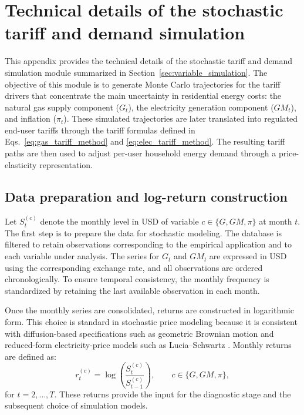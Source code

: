 \documentclass[authoryear,preprint,review,10pt]{elsarticle}
\begin{document}
\section{Technical details of the stochastic tariff and demand simulation}
\label{appendix:stochastic_simulation}

This appendix provides the technical details of the stochastic tariff and demand simulation module summarized in Section~\ref{sec:variable_simulation}. The objective of this module is to generate Monte Carlo trajectories for the tariff drivers that concentrate the main uncertainty in residential energy costs: the natural gas supply component ($G_t$), the electricity generation component ($GM_t$), and inflation ($\pi_t$). These simulated trajectories are later translated into regulated end-user tariffs through the tariff formulas defined in Eqs.~\eqref{eq:gas_tariff_method} and \eqref{eq:elec_tariff_method}. The resulting tariff paths are then used to adjust per-user household energy demand through a price-elasticity representation.

\subsection{Data preparation and log-return construction}
\label{appendix:prep}

Let $S_t^{(c)}$ denote the monthly level in USD of variable $c \in \{G,GM,\pi\}$ at month $t$. The first step is to prepare the data for stochastic modeling. The database is filtered to retain observations corresponding to the empirical application and to each variable under analysis. The series for $G_t$ and $GM_t$ are expressed in USD using the corresponding exchange rate, and all observations are ordered chronologically. To ensure temporal consistency, the monthly frequency is standardized by retaining the last available observation in each month.

Once the monthly series are consolidated, returns are constructed in logarithmic form. This choice is standard in stochastic price modeling because it is consistent with diffusion-based specifications such as geometric Brownian motion \citep{ibrahim2021geometric} and reduced-form electricity-price models such as Lucia--Schwartz \citep{lucia2002electricity}. Monthly returns are defined as:
\begin{equation}
    r_t^{(c)} = \log\!\left(\frac{S_t^{(c)}}{S_{t-1}^{(c)}}\right),
    \qquad c \in \{G,GM,\pi\},
\end{equation}
for $t = 2,\dots,T$. These returns provide the input for the diagnostic stage and the subsequent choice of simulation models.
\end{document}
